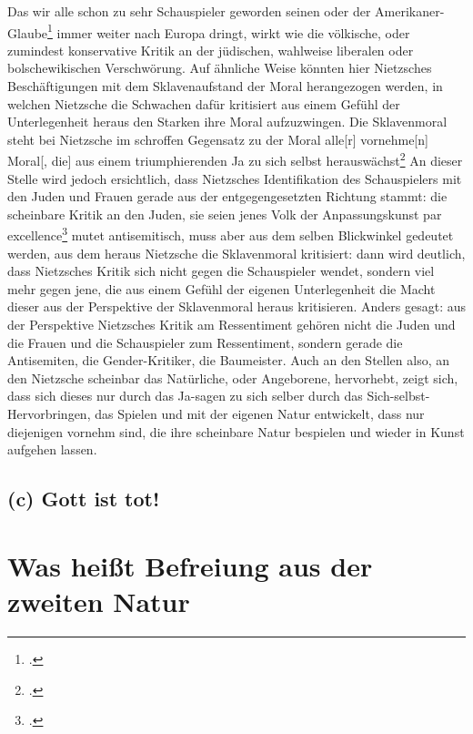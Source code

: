 \documentclass[12pt, a4paper, openany]{report}
\begin{document}
Das wir alle schon zu sehr Schauspieler geworden seinen oder der \glqq Amerikaner-Glaube\grqq\footcite[][596]{nietzsche_morgenrote_1999} immer weiter nach Europa dringt, wirkt wie die völkische, oder zumindest konservative  Kritik an der jüdischen, wahlweise liberalen oder bolschewikischen Verschwörung.
Auf ähnliche Weise könnten hier Nietzsches Beschäftigungen mit dem \glqq Sklavenaufstand der Moral\grqq{} herangezogen werden, in welchen Nietzsche die Schwachen dafür kritisiert aus einem Gefühl der Unterlegenheit heraus den Starken ihre Moral aufzuzwingen. 
Die Sklavenmoral steht bei Nietzsche im schroffen Gegensatz zu der Moral \glqq alle[r] vornehme[n] Moral[, die] aus einem triumphierenden Ja zu sich selbst herauswächst\grqq\footcite[][S. 10?]{nietzsche_jenseits_2014} 
An dieser Stelle wird jedoch ersichtlich, dass Nietzsches Identifikation des Schauspielers mit den Juden und Frauen gerade aus der entgegengesetzten Richtung stammt:
die scheinbare Kritik an den Juden, sie seien \glqq jenes Volk der Anpassungskunst par excellence\grqq\footcite[][609]{nietzsche_morgenrote_1999} mutet antisemitisch, muss aber aus dem selben Blickwinkel gedeutet werden, aus dem heraus Nietzsche die Sklavenmoral kritisiert:
dann wird deutlich, dass Nietzsches Kritik sich nicht gegen die Schauspieler wendet, sondern viel mehr gegen jene, die aus einem Gefühl der eigenen Unterlegenheit die Macht dieser aus der Perspektive der Sklavenmoral heraus kritisieren. 
Anders gesagt: aus der Perspektive Nietzsches Kritik am Ressentiment gehören nicht die Juden und die Frauen und die Schauspieler zum Ressentiment, sondern gerade die Antisemiten, die Gender-Kritiker, die Baumeister. 
Auch an den Stellen also, an den Nietzsche scheinbar das Natürliche, oder Angeborene, hervorhebt, zeigt sich, dass sich dieses nur durch das \glqq Ja-sagen zu sich selber\grqq{} durch das Sich-selbst-Hervorbringen, das Spielen und mit der eigenen \glqq Natur\grqq{} entwickelt, dass nur diejenigen vornehm sind, die ihre scheinbare Natur bespielen und wieder in Kunst aufgehen lassen.

\subsection{(c) Gott ist tot!}
\section{Was heißt Befreiung aus der zweiten Natur}\label{abschnitt_3}
\end{document}
